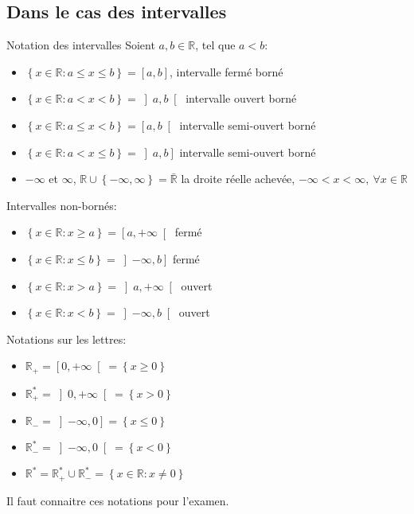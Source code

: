 \documentclass{article}
\begin{document}
\subsection{Dans le cas des intervalles}
\begin{parag}{Notation des intervalles}
    Soient $a,b \in \mathbb{R}$, tel que $a < b$:
    \begin{itemize}
        \item $\left\{x \in \mathbb{R} : a \leq x \leq b\right\} = \left[a, b\right]$, intervalle fermé borné
        \item $\left\{x \in \mathbb{R} : a < x < b\right\} = \left]a,b\right[$ intervalle ouvert borné
        \item $\left\{x \in \mathbb{R} : a \leq x < b\right\} = \left[a, b\right[$ intervalle semi-ouvert borné
        \item $\left\{x \in \mathbb{R} : a < x \leq b\right\} = \left]a, b\right]$ intervalle semi-ouvert borné
        \item $-\infty$ et $\infty$, $\mathbb{R} \cup \left\{-\infty, \infty\right\} = \bar{\mathbb{R}}$ la droite réelle achevée, $-\infty < x < \infty,\ \forall x \in \mathbb{R}$
    \end{itemize}

    Intervalles non-bornés:
    \begin{itemize}
        \item $\left\{x \in \mathbb{R}: x \geq a\right\} = \left[a, +\infty\right[$ fermé
    \item $\left\{x \in \mathbb{R} : x \leq b\right\} = \left]-\infty, b\right]$ fermé
    \item $\left\{x \in \mathbb{R} : x > a\right\} = \left]a, +\infty\right[$ ouvert
    \item $\left\{x \in \mathbb{R} : x < b\right\} = \left]-\infty, b\right[$ ouvert
    \end{itemize}

    Notations sur les lettres:
    \begin{itemize}
        \item $\mathbb{R}_+ = \left[0, +\infty\right[ = \left\{x \geq 0\right\}$
        \item $\mathbb{R}^*_+ = \left]0, +\infty\right[ = \left\{x > 0\right\}$
        \item $\mathbb{R}_- = \left]-\infty, 0\right] = \left\{x \leq 0\right\}$
        \item $\mathbb{R}^*_- = \left]-\infty, 0\right[ = \left\{x < 0\right\}$
        \item $\mathbb{R}^* = \mathbb{R}^*_+ \cup \mathbb{R}^*_- = \left\{x \in \mathbb{R} : x \neq 0\right\}$
    \end{itemize}


    Il faut connaitre ces notations pour l'examen.
\end{parag}
\end{document}
